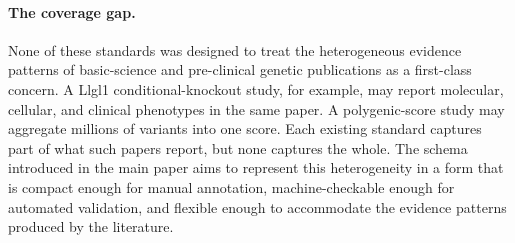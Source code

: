 \paragraph{The coverage gap.}
None of these standards was designed to treat the heterogeneous evidence
patterns of basic-science and pre-clinical genetic publications as a
first-class concern. A Llgl1 conditional-knockout study, for example, may
report molecular, cellular, and clinical phenotypes in the same paper. A
polygenic-score study may aggregate millions of variants into one score. Each
existing standard captures part of what such papers report, but none captures
the whole. The schema introduced in the main paper aims to represent this
heterogeneity in a form that is compact enough for manual annotation,
machine-checkable enough for automated validation, and flexible enough to
accommodate the evidence patterns produced by the literature.
